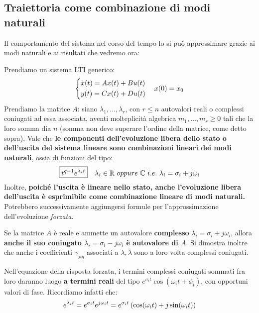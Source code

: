 \documentclass[a4paper]{report}
\begin{document}
\subsection{Traiettoria come combinazione di modi naturali}
Il comportamento del sistema nel corso del tempo lo si può approssimare grazie ai modi naturali e ai risultati che vedremo  ora:
\bb\begin{defin}{}{}
Prendiamo un sistema LTI generico:
\begin{equation*}
	\begin{dcases}
		\dot x(t) = Ax(t)+Bu(t) \\
		y(t) = Cx(t)+Du(t)
	\end{dcases} \quad x(0)=x_0 
\end{equation*}
Prendiamo la matrice $A$: siano $\lambda_1,\ldots, \lambda_r$, con $r \leq n$ autovalori reali o complessi coniugati ad essa associata, aventi molteplicità algebrica $m_1, \ldots, m_r \geq 0$ tali che la loro somma dia $n$ (somma non deve superare l'ordine della matrice, come detto sopra).
Vale che \textbf{le  componenti dell'evoluzione libera dello stato o dell'uscita del sistema lineare sono combinazioni lineari dei modi naturali}, ossia di funzioni del tipo:
\begin{equation}
	\boxed{t^{q-1}e^{\lambda_i t}} \quad \lambda_i \in \mathbb{R} \ oppure \ \mathbb{C} \ i.e. \ \lambda_i = \sigma_i + j\omega_i
\end{equation} Inoltre, \textbf{poiché l'uscita è lineare nello stato, anche l'evoluzione libera dell'uscita è esprimibile come combinazione lineare di modi naturali.} Potrebbero successivamente aggiungersi formule per l'approssimazione dell'evoluzione \textit{forzata}.
\end{defin}

\begin{prop}
	Se la matrice $A$ è reale e ammette un autovalore \textbf{complesso} $\lambda_i = \sigma_i + j\omega_i$, allora \textbf{anche il suo coniugato $\bar \lambda_i = \sigma_i - j\omega_i$ è autovalore di $A$}. Si dimostra inoltre che anche i coefficienti $\gamma_{jiq}$ associati a $\lambda, \bar \lambda$ sono a loro volta complessi coniugati.
\end{prop}
Nell'equazione della risposta forzata, i termini complessi coniugati sommati fra loro daranno luogo \textbf{a termini reali} del tipo $e^{\sigma_i t}\cos(\omega_i t+\phi_i)$, con opportuni valori di fase.
Ricordiamo infatti che:
\begin{equation*}
	e^{\lambda_i t} = e^{\sigma_i t}e^{j\omega_i t} = e^{\sigma_i t} \left( \cos(\omega_i t ) + j\sin(\omega_i t) \right)
\end{equation*}
\end{document}
